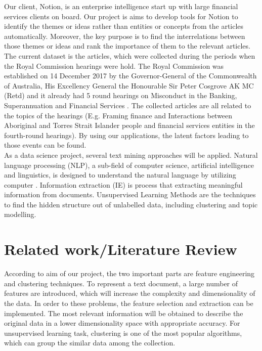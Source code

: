 \documentclass[12pt]{article}
\begin{document}
Our client, Notion, is an enterprise intelligence start up with large financial services clients on board. Our project is aims to develop tools for Notion to identify the themes or ideas rather than entities or concepts from the articles automatically. Moreover, the key purpose is to find the interrelations between those themes or ideas and rank the importance of them to the relevant articles. The current dataset is the articles, which were collected during the periods when the Royal Commission hearings were hold. The Royal Commission was established on 14 December 2017 by the Governor-General of the Commonwealth of Australia, His Excellency General the Honourable Sir Peter Cosgrove AK MC (Retd) and it already had 5 round hearings on Misconduct in the Banking, Superannuation and Financial Services \cite{royalcommission}. The collected articles are all related to the topics of the hearings (E.g. Framing finance and Interactions between Aboriginal and Torres Strait Islander people and financial services entities in the fourth-round hearings). By using our applications, the latent factors leading to those events can be found. \\

As a data science project, several text mining approaches will be applied. Natural language processing (NLP), a sub-field of computer science, artificial intelligence and linguistics, is designed to understand the natural language by utilizing computer \cite{allahyari2017brief}. Information extraction (IE) is process that extracting meaningful information from documents. Unsupervised Learning Methods are the techniques to find the hidden structure out of unlabelled data, including clustering and topic modelling. \\

\section{Related work/Literature Review}\label{sec:lr}
According to aim of our project, the two important parts are feature engineering and clustering techniques. To represent a text document, a large number of features are introduced, which will increase the complexity and dimensionality of the data. In order to these problems, the feature selection and extraction can be implemented. The most relevant information will be obtained to describe the original data in a lower dimensionality space with appropriate accuracy. For unsupervised learning task, clustering is one of the most popular algorithms, which can group the similar data among the collection. 
\end{document}
